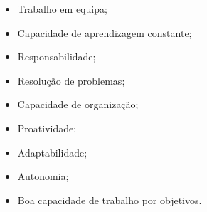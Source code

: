 \begin{minipage}[t]{0.5\textwidth}
	\begin{itemize}
		\item Trabalho em equipa;
		\item Capacidade de aprendizagem constante;
		\item Responsabilidade;
		\item Resolução de problemas;
		\item Capacidade de organização;
	\end{itemize}
\end{minipage}
\begin{minipage}[t]{0.5\textwidth}
	\begin{itemize}
		\item Proatividade;
		\item Adaptabilidade;
		\item Autonomia;
		\item Boa capacidade de trabalho por objetivos.
	\end{itemize}
\end{minipage}

\vspace{5pt}
